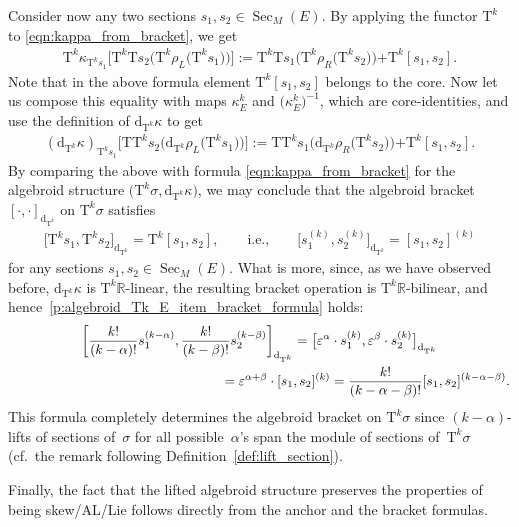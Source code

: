 \documentclass[10pt,a4paper]{amsart}
\newcommand{\R}{\mathbb{R}}
\newcommand{\Sec}{\operatorname{Sec}}
\newcommand{\dd}{\mathrm{d}}
\newcommand{\eps}{\varepsilon}
\newcommand{\plus}{\boldsymbol{\pmb{+}}}
\newcommand{\rhoL}{\rho_L} %
\newcommand{\rhoR}{\rho_R}
\newcommand{\T}{\mathrm{T}} %
\newcommand{\TT}[1]{\mathrm{T}^{#1}} %
\numberwithin{equation}{section}
\theoremstyle{definition}
\begin{document}
 Consider now any two sections $s_1,s_2\in\Sec_M(E)$. By applying the functor $\TT{k}$ to \eqref{eqn:kappa_from_bracket}, we get
\begin{gather*}\TT{k}\kappa_{\TT{k} s_1}\big[\TT{k}\T s_2\big(\TT{k}\rhoL\big(\TT{k} s_1\big)\big)\big]:=\TT{k}\T s_1\big(\TT{k}\rhoR\big(\TT{k}s_2\big)\big)\plus \TT{k}[s_1,s_2].\end{gather*}
Note that in the above formula element $\TT{k}[s_1,s_2]$ belongs to the core. Now let us compose this equality with maps $\kappa^k_E$ and $\big(\kappa^k_E\big)^{-1}$, which are core-identities, and use the definition of $\dd_{\TT{k}}\kappa$ to get
 \begin{gather*}(\dd_{\TT{k}}\kappa)_{\TT{k} s_1}\big[\T\TT{k} s_2\big(\dd_{\TT{k}}\rhoL\big(\TT{k} s_1\big)\big)\big]:=\T\TT{k} s_1\big(\dd_{\TT{k}}\rhoR\big(\TT{k}s_2\big)\big)\plus \TT{k}[s_1,s_2].\end{gather*}
By comparing the above with formula \eqref{eqn:kappa_from_bracket} for the algebroid structure $\big(\TT{k}\sigma, \dd_{\TT{k}}\kappa\big)$, we may conclude that the algebroid bracket $[\cdot,\cdot]_{\dd_{\TT{k}}}$ on $\TT{k}\sigma$ satisfies
\begin{gather*}\big[\TT{k}s_1,\TT{k} s_2\big]_{\dd_{\TT{k}}}=\TT{k}[s_1,s_2],\qquad \text{i.e.,}\qquad \big[s_1^{(k)},s_2^{(k)}\big]_{\dd_{\TT{k}}}=[s_1,s_2]^{(k)}\end{gather*}
for any sections $s_1,s_2\in\Sec_M(E)$. What is more, since, as we have observed before, $\dd_{\TT{k}}\kappa$ is $\TT{k}\R$-linear, the resulting bracket operation is $\TT{k}\R$-bilinear, and hence~\eqref{p:algebroid_Tk_E_item_bracket_formula} holds:
\begin{gather*}
\left[ \frac{k!}{(k-\alpha)!}s_1^{(k-\alpha)}, \frac{k!}{(k-\beta)!}s_2^{(k-\beta)}\right]_{\dd_{\TT{k}}}= \big[\eps^\alpha\cdot s_1^{(k)},\eps^\beta\cdot s_2^{(k)}\big]_{\dd_{\TT{k}}}\\
\hphantom{\left[ \frac{k!}{(k-\alpha)!}s_1^{(k-\alpha)}, \frac{k!}{(k-\beta)!}s_2^{(k-\beta)}\right]_{\dd_{\TT{k}}}}{} =\eps^{\alpha+\beta}\cdot[s_1,s_2]^{(k)}= \frac{k!}{(k-\alpha-\beta)!} [s_1,s_2]^{(k-\alpha-\beta)}.
\end{gather*}
This formula completely determines the algebroid bracket on $\TT{k}\sigma$ since $(k-\alpha)$-lifts of sections of~$\sigma$ for all possible~$\alpha$'s span the module of sections of~$\TT{k}\sigma$ (cf.\ the remark following Definition~\ref{def:lift_section}).

Finally, the fact that the lifted algebroid structure preserves the properties of being \linebreak skew/AL/Lie follows directly from the anchor and the bracket formulas. %
\end{document}
